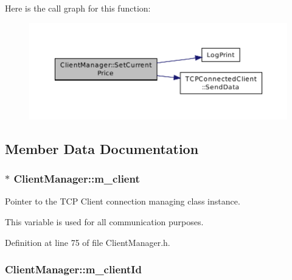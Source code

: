Here is the call graph for this function\-:\nopagebreak
\begin{figure}[H]
\begin{center}
\leavevmode
\includegraphics[width=350pt]{class_client_manager_adb64a2ee5d0eb7b1a4bdedcd0e3b92f5_cgraph}
\end{center}
\end{figure}




\subsection{Member Data Documentation}
\hypertarget{class_client_manager_a86ae04f2ac9f2988559a023d877f78e4}{
\subsubsection[{m\-\_\-client}]{$\ast$ Client\-Manager\-::m\-\_\-client\hspace{0.3cm}{\ttfamily [private]}}}\label{class_client_manager_a86ae04f2ac9f2988559a023d877f78e4}


Pointer to the T\-C\-P Client connection managing class instance. 

This variable is used for all communication purposes. 

Definition at line 75 of file Client\-Manager.\-h.

\hypertarget{class_client_manager_a1216ffa88107c33825adafe63fea2263}{
\subsubsection[{m\-\_\-client\-Id}]{ Client\-Manager\-::m\-\_\-client\-Id\hspace{0.3cm}{\ttfamily [private]}}}\label{class_client_manager_a1216ffa88107c33825adafe63fea2263}


